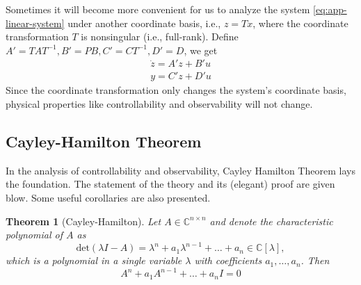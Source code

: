 \documentclass[
]{book}
\newtheorem{theorem}{Theorem}[chapter]
\theoremstyle{definition}
\theoremstyle{definition}
\theoremstyle{definition}
\theoremstyle{definition}
\theoremstyle{remark}
\begin{document}
Sometimes it will become more convenient for us to analyze the system \eqref{eq:app-linear-system} under another coordinate basis, i.e., \(z = T x\), where the coordinate transformation \(T\) is nonsingular (i.e., full-rank). Define \(A' = TAT^{-1}, B' = PB, C' = CT^{-1}, D' = D\), we get
\begin{equation*}
   \begin{split}
      \dot{z} = A' z + B' u \\ 
      y = C' z + D' u
   \end{split}
\end{equation*}
Since the coordinate transformation only changes the system's coordinate basis, physical properties like controllability and observability will not change.

\subsection{Cayley-Hamilton Theorem}\label{cayley-hamilton-theorem}

In the analysis of controllability and observability, Cayley Hamilton Theorem lays the foundation. The statement of the theory and its (elegant) proof are given blow. Some useful corollaries are also presented.

\begin{theorem}[Cayley-Hamilton]
\protect\hypertarget{thm:cayham}{}\label{thm:cayham}Let \(A \in \mathbb{C}^{n \times n}\) and denote the characteristic polynomial of \(A\) as
\[
   \text{det}(\lambda I - A) = \lambda^n + a_1 \lambda^{n-1} + \dots + a_n \in \mathbb{C}[\lambda],
\]
which is a polynomial in a single variable \(\lambda\) with coefficients \(a_1,\dots,a_n\).
Then
\[
   A^n + a_1 A^{n-1} + \dots + a_n I = 0
\]
\end{theorem}
\end{document}
